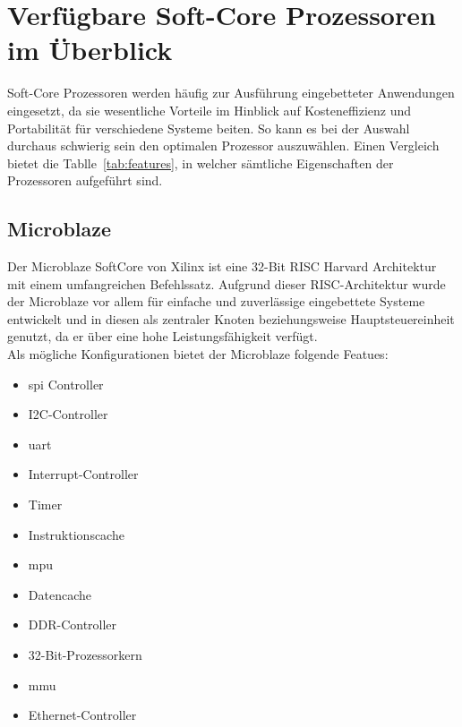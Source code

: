 \section{Verfügbare Soft-Core Prozessoren im Überblick}\label{kap:überblick}
Soft-Core Prozessoren werden häufig zur Ausführung eingebetteter Anwendungen eingesetzt, da sie wesentliche Vorteile im Hinblick auf Kosteneffizienz und Portabilität für verschiedene Systeme
beiten. So kann es bei der Auswahl durchaus schwierig sein den optimalen Prozessor auszuwählen. Einen Vergleich bietet die Tablle~\ref{tab:features}, in welcher sämtliche Eigenschaften
der Prozessoren aufgeführt sind.\\

\subsection{Microblaze}\label{kap:Microblaze}


Der Microblaze SoftCore von Xilinx ist eine 32-Bit RISC Harvard Architektur mit einem umfangreichen Befehlssatz. Aufgrund dieser RISC-Architektur
 wurde der Microblaze vor allem für einfache und zuverlässige eingebettete Systeme entwickelt und in diesen als zentraler Knoten beziehungsweise Hauptsteuereinheit
genutzt, da er über eine hohe Leistungsfähigkeit verfügt.~\cite{microblaze}\\
Als mögliche Konfigurationen bietet der Microblaze folgende Featues:
        \begin{itemize}
          \item \ac{spi} Controller
          \item I2C-Controller
          \item \ac{uart}
          \item Interrupt-Controller
          \item  Timer
          \item Instruktionscache
          \item \ac{mpu}
          \item Datencache
          \item DDR-Controller
          \item 32-Bit-Prozessorkern
          \item \ac{mmu}
          \item Ethernet-Controller
        \end{itemize}

